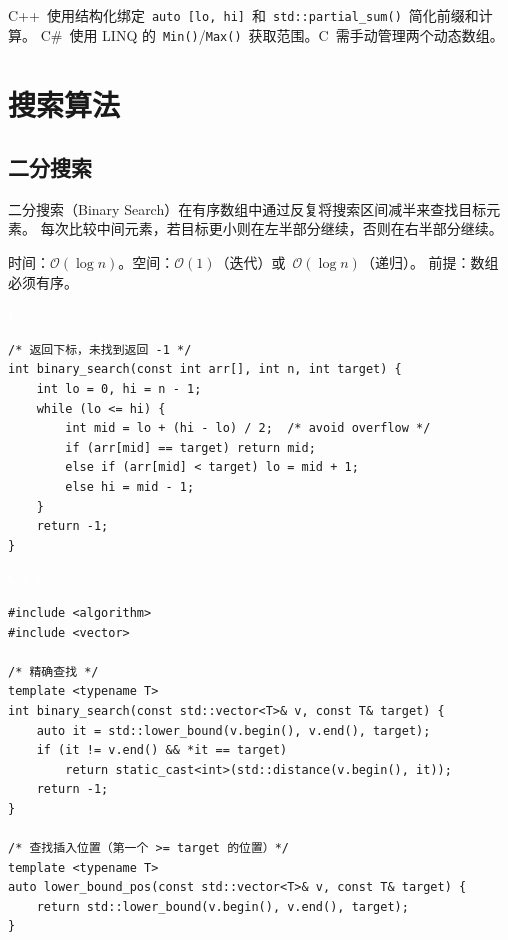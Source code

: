 \documentclass[12pt,a4paper,fontset=fandol]{ctexbook}
\newcommand{\clabel}{%
  \noindent\begin{tcolorbox}[sharp corners,colback=cheadbg,colframe=cheadbg,
    left=6pt,right=6pt,top=2pt,bottom=2pt,boxrule=0pt]
  \textcolor{white}{\small\bfseries\sffamily C}\end{tcolorbox}%
}
\newcommand{\cpplabel}{%
  \noindent\begin{tcolorbox}[sharp corners,colback=cppheadbg,colframe=cppheadbg,
    left=6pt,right=6pt,top=2pt,bottom=2pt,boxrule=0pt]
  \textcolor{white}{\small\bfseries\sffamily C++}\end{tcolorbox}%
}
\newcommand{\bigO}[1]{\mathcal{O}(#1)}
\newcommand{\Fn}[1]{\texttt{#1()}}
\newcommand{\Tp}[1]{\texttt{#1}}
\begin{document}
\begin{compare}
C++~使用结构化绑定~\texttt{auto [lo, hi]}~和~\Fn{std::partial\_sum}~简化前缀和计算。
C\#~使用 LINQ 的~\Tp{Min()}/\allowbreak{}\Tp{Max()}~获取范围。C~需手动管理两个动态数组。
\end{compare}

\part{搜索算法}

\chapter{二分搜索}

二分搜索（Binary Search）在有序数组中通过反复将搜索区间减半来查找目标元素。
每次比较中间元素，若目标更小则在左半部分继续，否则在右半部分继续。

\begin{complexitybox}
  时间：$\bigO{\log n}$。空间：$\bigO{1}$（迭代）或~$\bigO{\log n}$（递归）。
  前提：数组必须有序。
\end{complexitybox}

\clabel
\begin{lstlisting}[style=cstyle]
/* 返回下标，未找到返回 -1 */
int binary_search(const int arr[], int n, int target) {
    int lo = 0, hi = n - 1;
    while (lo <= hi) {
        int mid = lo + (hi - lo) / 2;  /* avoid overflow */
        if (arr[mid] == target) return mid;
        else if (arr[mid] < target) lo = mid + 1;
        else hi = mid - 1;
    }
    return -1;
}
\end{lstlisting}

\cpplabel
\begin{lstlisting}[style=cppstyle]
#include <algorithm>
#include <vector>

/* 精确查找 */
template <typename T>
int binary_search(const std::vector<T>& v, const T& target) {
    auto it = std::lower_bound(v.begin(), v.end(), target);
    if (it != v.end() && *it == target)
        return static_cast<int>(std::distance(v.begin(), it));
    return -1;
}

/* 查找插入位置（第一个 >= target 的位置）*/
template <typename T>
auto lower_bound_pos(const std::vector<T>& v, const T& target) {
    return std::lower_bound(v.begin(), v.end(), target);
}
\end{lstlisting}
\end{document}
